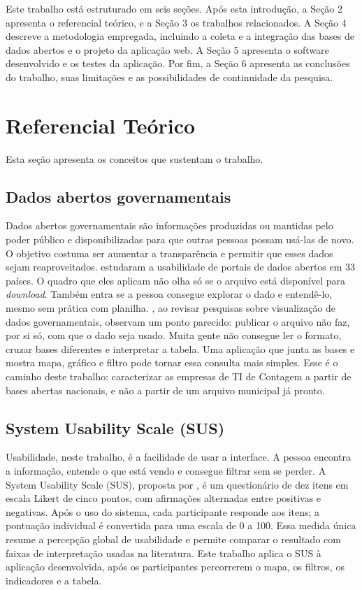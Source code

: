 \documentclass[a4paper,12pt]{article}
\begin{document}
Este trabalho está estruturado em seis seções.
Após esta introdução, a Seção 2 apresenta o referencial teórico, e a Seção 3 os trabalhos relacionados.
A Seção 4 descreve a metodologia empregada, incluindo a coleta e a integração das bases de dados abertos e o projeto da aplicação web.
A Seção 5 apresenta o software desenvolvido e os testes da aplicação.
Por fim, a Seção 6 apresenta as conclusões do trabalho, suas limitações e as possibilidades de continuidade da pesquisa.

\section{Referencial Teórico}

Esta seção apresenta os conceitos que sustentam o trabalho.

\subsection{Dados abertos governamentais}

Dados abertos governamentais são informações produzidas ou mantidas pelo poder público e disponibilizadas para que outras pessoas possam usá-las de novo.
O objetivo costuma ser aumentar a transparência e permitir que esses dados sejam reaproveitados.
 estudaram a usabilidade de portais de dados abertos em 33 países.
O quadro que eles aplicam não olha só se o arquivo está disponível para \textit{download}.
Também entra se a pessoa consegue explorar o dado e entendê-lo, mesmo sem prática com planilha.
, ao revisar pesquisas sobre visualização de dados governamentais, observam um ponto parecido: publicar o arquivo não faz, por si só, com que o dado seja usado.
Muita gente não consegue ler o formato, cruzar bases diferentes e interpretar a tabela.
Uma aplicação que junta as bases e mostra mapa, gráfico e filtro pode tornar essa consulta mais simples.
Esse é o caminho deste trabalho: caracterizar as empresas de TI de Contagem a partir de bases abertas nacionais, e não a partir de um arquivo municipal já pronto.

\subsection{System Usability Scale (SUS)}

Usabilidade, neste trabalho, é a facilidade de usar a interface.
A pessoa encontra a informação, entende o que está vendo e consegue filtrar sem se perder.
A System Usability Scale (SUS), proposta por , é um questionário de dez itens em escala Likert de cinco pontos, com afirmações alternadas entre positivas e negativas.
Após o uso do sistema, cada participante responde aos itens; a pontuação individual é convertida para uma escala de 0 a 100.
Essa medida única resume a percepção global de usabilidade e permite comparar o resultado com faixas de interpretação usadas na literatura.
Este trabalho aplica o SUS à aplicação desenvolvida, após os participantes percorrerem o mapa, os filtros, os indicadores e a tabela.
\end{document}
